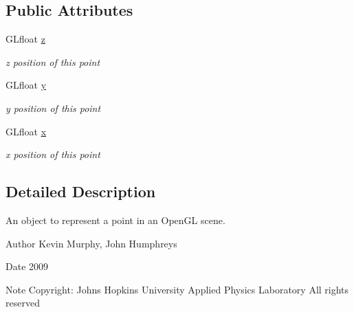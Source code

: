 \subsection*{Public Attributes}
\begin{DoxyCompactItemize}
\item 
\hypertarget{classgl_point_a5eea4f1e5a5d5eae95fdf599e9725882}{
GLfloat \hyperlink{classgl_point_a5eea4f1e5a5d5eae95fdf599e9725882}{z}}
\label{classgl_point_a5eea4f1e5a5d5eae95fdf599e9725882}

\begin{DoxyCompactList}\small\item\em z position of this point \end{DoxyCompactList}\item 
\hypertarget{classgl_point_af00682a76546bb32b6553aae98f82bb9}{
GLfloat \hyperlink{classgl_point_af00682a76546bb32b6553aae98f82bb9}{y}}
\label{classgl_point_af00682a76546bb32b6553aae98f82bb9}

\begin{DoxyCompactList}\small\item\em y position of this point \end{DoxyCompactList}\item 
\hypertarget{classgl_point_abd28a73b53e71fc987be8c1bcb022c2d}{
GLfloat \hyperlink{classgl_point_abd28a73b53e71fc987be8c1bcb022c2d}{x}}
\label{classgl_point_abd28a73b53e71fc987be8c1bcb022c2d}

\begin{DoxyCompactList}\small\item\em x position of this point \end{DoxyCompactList}\end{DoxyCompactItemize}


\subsection{Detailed Description}
An object to represent a point in an OpenGL scene. 

\begin{DoxyAuthor}{Author}
Kevin Murphy, John Humphreys 
\end{DoxyAuthor}
\begin{DoxyDate}{Date}
2009 
\end{DoxyDate}
\begin{DoxyNote}{Note}
Copyright: Johns Hopkins University Applied Physics Laboratory All rights reserved 
\end{DoxyNote}


